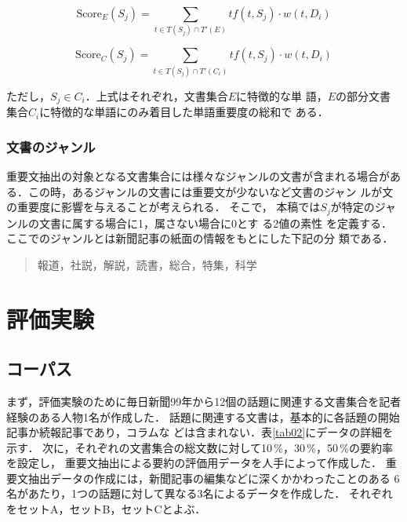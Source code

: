 \[
 \mbox{Score}_{E}(S_j) = \sum_{t \in T(S_j) \cap T'(E)}tf(t,S_j) \cdot w(t,D_i)
\]

\[
 \mbox{Score}_{C}(S_j) = \sum_{t \in T(S_j) \cap T'(C_i)}tf(t,S_j) \cdot w(t,D_i)
\]

\noindent ただし，$S_j \in C_i$．上式はそれぞれ，文書集合$E$に特徴的な単
語，$E$の部分文書集合$C_i$に特徴的な単語にのみ着目した単語重要度の総和で
ある．


\subsubsection*{文書のジャンル}

重要文抽出の対象となる文書集合には様々なジャンルの文書が含まれる場合があ
る．この時，あるジャンルの文書には重要文が少ないなど文書のジャン
ルが文の重要度に影響を与えることが考えられる．
そこで，
本稿では$S_j$が特定のジャンルの文書に属する場合に1，属さない場合に0とす
る2値の素性
を定義する．ここでのジャンルとは新聞記事の紙面の情報をもとにした下記の分
類である．

\begin{quote}
 報道，社説，解説，読書，総合，特集，科学
\end{quote}


\section{評価実験}

\subsection{コーパス}

まず，評価実験のために毎日新聞99年から12個の話題に関連する文書集合を記者
経験のある人物1名が作成した．
話題に関連する文書は，基本的に各話題の開始記事か続報記事であり，コラムな
どは含まれない．表\ref{tab02}にデータの詳細を示す．
次に，それぞれの文書集合の総文数に対して10\,\%，30\,\%，50\,\%の要約率を設定し，
重要文抽出による要約の評価用データを人手によって作成した．
重要文抽出データの作成には，新聞記事の編集などに深くかかわったことのある
6名があたり，1つの話題に対して異なる3名によるデータを作成した．
それぞれをセットA，セットB，セットCとよぶ．


